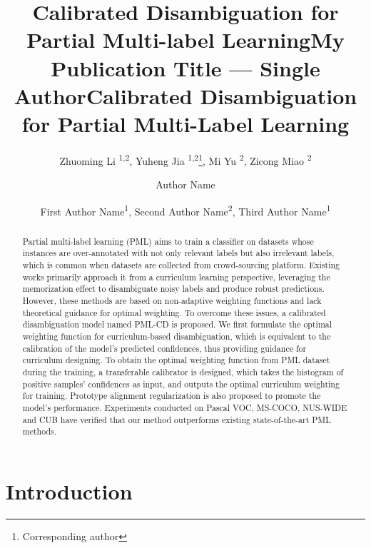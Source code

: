 \documentclass[letterpaper]{article} %
\title{Calibrated Disambiguation for Partial Multi-label Learning}
\author{
  Zhuoming Li \textsuperscript{\rm 1,2}, 
  Yuheng Jia \textsuperscript{\rm 1,2}\thanks{Corresponding author}, 
  Mi Yu \textsuperscript{\rm 2}, 
  Zicong Miao \textsuperscript{\rm 2}\\
}
\title{My Publication Title --- Single Author}
\author {
  Author Name
}
\title{Calibrated Disambiguation for Partial Multi-Label Learning}
\author {
  First Author Name\textsuperscript{\rm 1},
  Second Author Name\textsuperscript{\rm 2},
  Third Author Name\textsuperscript{\rm 1}
}
\begin{document}
\maketitle

\begin{abstract}
  Partial multi-label learning (PML) aims to train a classifier on datasets whose instances are over-annotated with not only relevant labels but also irrelevant labels, which is common when datasets are collected from crowd-sourcing platform. Existing works primarily approach it from a curriculum learning perspective, leveraging the memorization effect to disambiguate noisy labels and produce robust predictions. However, these methods are based on non-adaptive weighting functions and lack theoretical guidance for optimal weighting. To overcome these issues, a calibrated disambiguation model named PML-CD is proposed. 
  We first formulate the optimal weighting function for curriculum-based disambiguation, which is equivalent to the calibration of the model's predicted confidences, thus providing guidance for curriculum designing. To obtain the optimal weighting function from PML dataset during the training, a transferable calibrator is designed, which takes the histogram of positive samples' confidences as input, and outputs the optimal curriculum weighting for training. Prototype alignment regularization is also proposed to promote the model's performance. 
  Experiments conducted on Pascal VOC, MS-COCO, NUS-WIDE and CUB have verified that our method outperforms existing state-of-the-art PML methods.
\end{abstract}

\begin{links}
\end{links}

%

\section{Introduction}
\end{document}
